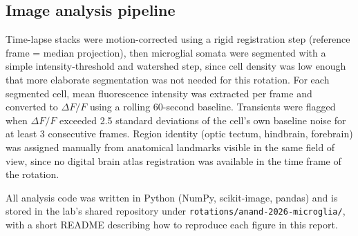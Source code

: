 \subsection{Image analysis pipeline}

Time-lapse stacks were motion-corrected using a rigid registration step (reference
frame = median projection), then microglial somata were segmented with a simple
intensity-threshold and watershed step, since cell density was low enough that more
elaborate segmentation was not needed for this rotation. For each segmented cell,
mean fluorescence intensity was extracted per frame and converted to $\Delta F/F$
using a rolling 60-second baseline. Transients were flagged when $\Delta F/F$ exceeded
2.5 standard deviations of the cell's own baseline noise for at least 3 consecutive
frames. Region identity (optic tectum, hindbrain, forebrain) was assigned manually
from anatomical landmarks visible in the same field of view, since no digital brain
atlas registration was available in the time frame of the rotation.

All analysis code was written in Python (NumPy, scikit-image, pandas) and is stored in
the lab's shared repository under \texttt{rotations/anand-2026-microglia/}, with a
short README describing how to reproduce each figure in this report.
